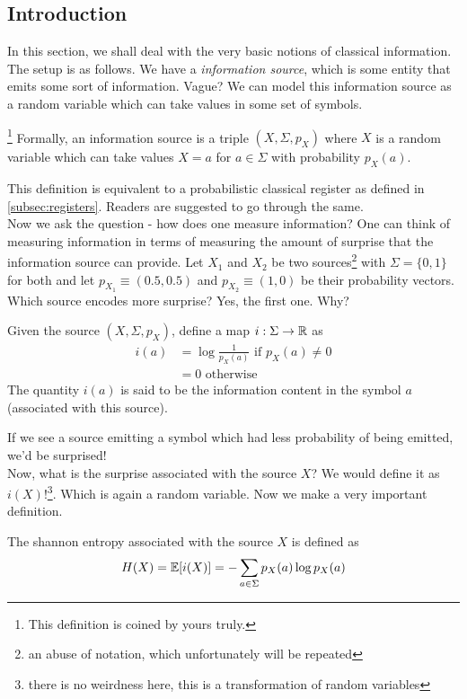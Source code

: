 \subsection{Introduction}
In this section, we shall deal with the very basic notions of classical information. The setup is as follows. We have a \textit{information source}, which is some entity that emits some sort of information. Vague? We can model this information source as a random variable which can take values in some set of symbols. 
\begin{definition}\footnote{This definition is coined by yours truly.}
Formally, an information source is a triple $(X,\Sigma,p_X)$ where $X$ is a random variable which can take values $X=a$ for $a\in\Sigma$ with probability $p_X(a)$.
\end{definition}\noindent
This definition is equivalent to a probabilistic classical register as defined in \ref{subsec:registers}. Readers are suggested to go through the same.\\\noindent 
Now we ask the question - how does one measure information? One can think of measuring information in terms of measuring the amount of surprise that the information source can provide. Let $X_1$ and $X_2$ be two sources\footnote{an abuse of notation, which unfortunately will be repeated} with $\Sigma = \{0,1\}$ for both and let $p_{X_1} \equiv (0.5,0.5)$ and $p_{X_2} \equiv (1,0)$ be their probability vectors. Which source encodes more surprise? Yes, the first one. Why?
\begin{definition}
Given the source $(X,\Sigma,p_X)$, define a map $i:\Sigma \to \mathbb{R}$ as 
\[\]
\begin{align*}
    i(a) &= \log{\frac{1}{p_X(a)}} \text{ if } p_X(a) \neq 0\\ 
    &= 0 \text{ otherwise}
\end{align*}
The quantity $i(a)$ is said to be the information content in the symbol $a$ (associated with this source).
\end{definition}
\noindent If we see a source emitting a symbol which had less probability of being emitted, we'd be surprised! \\\noindent 
Now, what is the surprise associated with the source $X$? We would define it as $i(X)$!\footnote{there is no weirdness here, this is a transformation of random variables}. Which is again a random variable. Now we make a very important definition. 
\begin{definition}
The shannon entropy associated with the source $X$ is defined as 
\[H(X) = \mathbb{E}[i(X)] =- \sum_{a\in\Sigma}p_X(a)\log{p_X(a)}\]
\end{definition}
\newpage 